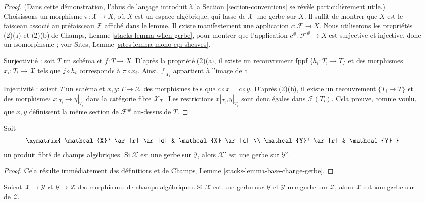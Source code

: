 \begin{proof}
(Dans cette démonstration, l'abus de langage introduit à la
Section \ref{section-conventions} se révèle particulièrement utile.)
Choisissons un morphisme $\pi : \mathcal{X} \to X$, où $X$ est un espace
algébrique, qui fasse de $\mathcal{X}$ une gerbe sur $X$. Il suffit de
montrer que $X$ est le faisceau associé au préfaisceau $\mathcal{F}$ affiché
dans le lemme. Il existe manifestement une application
$c : \mathcal{F} \to X$. Nous utiliserons les propriétés (2)(a) et (2)(b) de
Champs, Lemme \ref{stacks-lemma-when-gerbe}, pour montrer que l'application
$c^\# : \mathcal{F}^\# \to X$ est surjective et injective, donc un
isomorphisme ; voir Sites, Lemme \ref{sites-lemma-mono-epi-sheaves}.

Surjectivité : soit $T$ un schéma et $f : T \to X$. D'après la propriété
(2)(a), il existe un recouvrement fppf $\{h_i : T_i \to T\}$ et des morphismes
$x_i : T_i \to \mathcal{X}$ tels que $f \circ h_i$ corresponde à
$\pi \circ x_i$. Ainsi, $f|_{T_i}$ appartient à l'image de $c$.

Injectivité : soient $T$ un schéma et $x, y : T \to \mathcal{X}$ des
morphismes tels que $c \circ x = c \circ y$. D'après (2)(b), il existe un
recouvrement $\{T_i \to T\}$ et des morphismes
$x|_{T_i} \to y|_{T_i}$ dans la catégorie fibre $\mathcal{X}_{T_i}$.
Les restrictions $x|_{T_i}, y|_{T_i}$ sont donc égales dans
$\mathcal{F}(T_i)$. Cela prouve, comme voulu, que $x, y$ définissent la même
section de $\mathcal{F}^\#$ au-dessus de $T$.
\end{proof}

\begin{lemma}
\label{lemma-base-change-gerbe}
Soit
$$
\xymatrix{
\mathcal{X}' \ar[r] \ar[d] & \mathcal{X} \ar[d] \\
\mathcal{Y}' \ar[r] & \mathcal{Y}
}
$$
un produit fibré de champs algébriques. Si $\mathcal{X}$ est une gerbe
sur $\mathcal{Y}$, alors $\mathcal{X}'$ est une gerbe sur
$\mathcal{Y}'$.
\end{lemma}

\begin{proof}
Cela résulte immédiatement des définitions et de Champs, Lemme
\ref{stacks-lemma-base-change-gerbe}.
\end{proof}

\begin{lemma}
\label{lemma-composition-gerbe}
Soient $\mathcal{X} \to \mathcal{Y}$ et
$\mathcal{Y} \to \mathcal{Z}$ des morphismes de champs algébriques. Si
$\mathcal{X}$ est une gerbe sur $\mathcal{Y}$ et $\mathcal{Y}$ une
gerbe sur $\mathcal{Z}$, alors $\mathcal{X}$ est une gerbe sur
de $\mathcal{Z}$.
\end{lemma}

